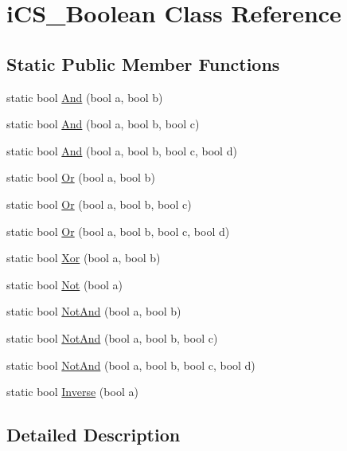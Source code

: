 \hypertarget{classi_c_s___boolean}{\section{i\+C\+S\+\_\+\+Boolean Class Reference}
\label{classi_c_s___boolean}
}
\subsection*{Static Public Member Functions}
\begin{DoxyCompactItemize}
\item 
static bool \hyperlink{classi_c_s___boolean_adec5a228aeddaeac4eefe7c4fdd73c5b}{And} (bool a, bool b)
\item 
static bool \hyperlink{classi_c_s___boolean_a321cd6a1da2b966b4770212f1d452118}{And} (bool a, bool b, bool c)
\item 
static bool \hyperlink{classi_c_s___boolean_a92ec4e69d19ed6f31649ba8e96887f82}{And} (bool a, bool b, bool c, bool d)
\item 
static bool \hyperlink{classi_c_s___boolean_a4f8a23884f70f1f962f92c37401419e8}{Or} (bool a, bool b)
\item 
static bool \hyperlink{classi_c_s___boolean_a5abcc785466b0d80ab429662badfde31}{Or} (bool a, bool b, bool c)
\item 
static bool \hyperlink{classi_c_s___boolean_ada06b40212d27095c300e7d51f602391}{Or} (bool a, bool b, bool c, bool d)
\item 
static bool \hyperlink{classi_c_s___boolean_ad60a5d9ca0bfb00655427548d8ce87ef}{Xor} (bool a, bool b)
\item 
static bool \hyperlink{classi_c_s___boolean_a381fb8fa890c53cd53fab5cfb86ba2b1}{Not} (bool a)
\item 
static bool \hyperlink{classi_c_s___boolean_a16830746c0821bc1607d385b72291b14}{Not\+And} (bool a, bool b)
\item 
static bool \hyperlink{classi_c_s___boolean_ab58b367379fa1ce08dbd36722326805d}{Not\+And} (bool a, bool b, bool c)
\item 
static bool \hyperlink{classi_c_s___boolean_aec7e3a0d441248654904a4c9f722165b}{Not\+And} (bool a, bool b, bool c, bool d)
\item 
static bool \hyperlink{classi_c_s___boolean_a3083a993ef3008180701911a31f84898}{Inverse} (bool a)
\end{DoxyCompactItemize}


\subsection{Detailed Description}


